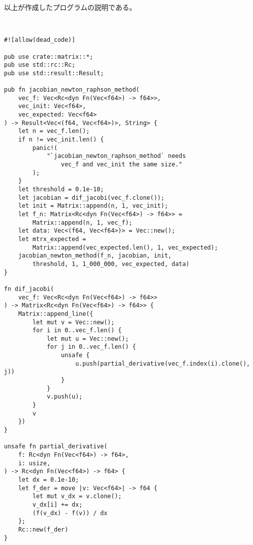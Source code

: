 \documentclass[uplatex, 11pt,a4j, titlepage]{jsarticle}
\begin{document}
以上が作成したプログラムの説明である。



\ 

\begin{lstlisting}[caption={newton\_raphson\_method.rs}]
#![allow(dead_code)]

pub use crate::matrix::*;
pub use std::rc::Rc;
pub use std::result::Result;
    
pub fn jacobian_newton_raphson_method(
    vec_f: Vec<Rc<dyn Fn(Vec<f64>) -> f64>>,
    vec_init: Vec<f64>,
    vec_expected: Vec<f64>
) -> Result<Vec<(f64, Vec<f64>)>, String> {
    let n = vec_f.len();
    if n != vec_init.len() {
        panic!(
            "`jacobian_newton_raphson_method` needs 
                vec_f and vec_init the same size."
        );
    }
    let threshold = 0.1e-10;
    let jacobian = dif_jacobi(vec_f.clone());
    let init = Matrix::append(n, 1, vec_init);
    let f_n: Matrix<Rc<dyn Fn(Vec<f64>) -> f64>> = 
        Matrix::append(n, 1, vec_f);
    let data: Vec<(f64, Vec<f64>)> = Vec::new();
    let mtrx_expected = 
        Matrix::append(vec_expected.len(), 1, vec_expected);
    jacobian_newton_method(f_n, jacobian, init, 
        threshold, 1, 1_000_000, vec_expected, data)
}
    
fn dif_jacobi(
    vec_f: Vec<Rc<dyn Fn(Vec<f64>) -> f64>>
) -> Matrix<Rc<dyn Fn(Vec<f64>) -> f64>> {
    Matrix::append_line({
        let mut v = Vec::new();
        for i in 0..vec_f.len() {
            let mut u = Vec::new();
            for j in 0..vec_f.len() {
                unsafe { 
                    u.push(partial_derivative(vec_f.index(i).clone(), j)) 
                }
            }
            v.push(u);
        }
        v
    })
}
    
unsafe fn partial_derivative(
    f: Rc<dyn Fn(Vec<f64>) -> f64>,
    i: usize,
) -> Rc<dyn Fn(Vec<f64>) -> f64> {
    let dx = 0.1e-10;
    let f_der = move |v: Vec<f64>| -> f64 {
        let mut v_dx = v.clone();
        v_dx[i] += dx;
        (f(v_dx) - f(v)) / dx
    };
    Rc::new(f_der)
}
    

\end{lstlisting}
\end{document}
